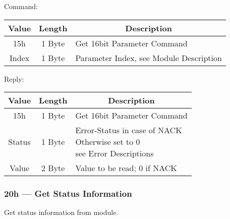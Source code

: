 Command:
\begin{table}[H]
    \centering
    \begin{tabular}{|c|c|l|}
        \hline
        \textbf{Value}   &   \textbf{Length} & \multicolumn{1}{|c|}{\textbf{Description}}\\ \hline \hline
        15h   &  1 Byte & Get 16bit Parameter Command \\ \hline
        Index & 1 Byte  & Parameter Index, see Module Description \\ \hline
    \end{tabular}
\label{tab:CAN-15-C}
\end{table}
Reply:
\begin{table}[H]
    \centering
    \begin{tabular}{|c|c|l|}
        \hline
        \textbf{Value}   &   \textbf{Length} & \multicolumn{1}{|c|}{\textbf{Description}}\\ \hline \hline
        15h   &  1 Byte & Get 16bit Parameter Command \\ \hline
        Status & 1 Byte & \makecell[l]{Error-Status in case of NACK \\ Otherwise set to 0\\see Error Descriptions}\\ \hline
        Value & 2 Byte & Value to be read; 0 if NACK \\ \hline
    \end{tabular}
\label{tab:CAN-15-R}
\end{table}

\subsubsection{20h --- Get Status Information}
Get status information from module.

